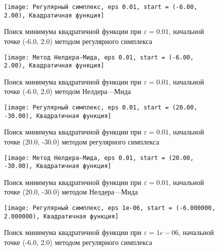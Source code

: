 \begin{table}[H]
\begin{tabular}{|c|c|c|c|}
\end{tabular}
\end{table}


            \begin{figure}[H]
	        \centering
	        \texttt{[image: Регулярный симплекс, eps 0.01, start = (-6.00, 2.00), Квадратичная функция]}%
	        \caption{Поиск минимума квадратичной функции при $\varepsilon = 0.01$, начальной точке (-6.0, 2.0) методом регулярного симплекса}
	        \vspace*{-1.2cm}
            \end{figure}
            
            \begin{figure}[H]
	        \centering
	        \texttt{[image: Метод Нелдера-Мида, eps 0.01, start = (-6.00, 2.00), Квадратичная функция]}%
	        \caption{Поиск минимума квадратичной функции при $\varepsilon = 0.01$, начальной точке (-6.0, 2.0) методом Нелдера---Мида}
	        \vspace*{-1.2cm}
            \end{figure}
            
            \begin{figure}[H]
	        \centering
	        \texttt{[image: Регулярный симплекс, eps 0.01, start = (20.00, -30.00), Квадратичная функция]}%
	        \caption{Поиск минимума квадратичной функции при $\varepsilon = 0.01$, начальной точке (20.0, -30.0) методом регулярного симплекса}
	        \vspace*{-1.2cm}
            \end{figure}
            
            \begin{figure}[H]
	        \centering
	        \texttt{[image: Метод Нелдера-Мида, eps 0.01, start = (20.00, -30.00), Квадратичная функция]}%
	        \caption{Поиск минимума квадратичной функции при $\varepsilon = 0.01$, начальной точке (20.0, -30.0) методом Нелдера---Мида}
	        \vspace*{-1.2cm}
            \end{figure}
            
            \begin{figure}[H]
	        \centering
	        \texttt{[image: Регулярный симплекс, eps 1e-06, start = (-6.000000, 2.000000), Квадратичная функция]}%
	        \caption{Поиск минимума квадратичной функции при $\varepsilon = 1e-06$, начальной точке (-6.0, 2.0) методом регулярного симплекса}
	        \vspace*{-1.2cm}
            \end{figure}
            
